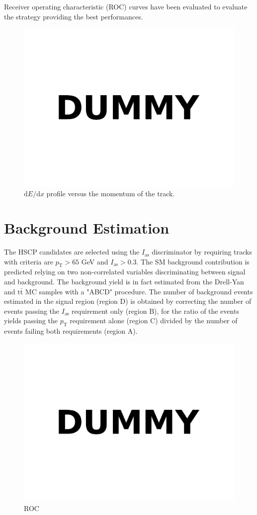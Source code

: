 \documentclass[11pt,twoside,a4paper]{article}
\begin{document}
Receiver operating characteristic (ROC) curves have been evaluated to evaluate the strategy providing the best performances.

\begin{figure}
\centering
\includegraphics[width=.5\textwidth]{figures/dummy.pdf}
\caption{$\mathrm{d}E/\mathrm{d}x$ profile versus the momentum of the track.\label{fig:dedxvsp}}
\end{figure}

\section{Background Estimation}

The HSCP candidates are selected using the $I_{\mathrm{as}}$ discriminator by requiring tracks with  criteria are $p_{\mathrm{T}} > 65$ GeV and $I_{\mathrm{as}} > 0.3$. 
The SM background contribution is predicted relying on two non-correlated variables discriminating between signal and background.
The background yield is in fact estimated from the Drell-Yan and $\mathrm{t}\bar{\mathrm{t}}$ MC samples with a "ABCD" procedure.
The number of background events estimated in the signal region (region D) is obtained by correcting the number of events passing the $I_{\mathrm{as}}$ requirement only (region B), for the ratio of the events yields passing the $p_{\mathrm{T}}$ requirement alone (region C) divided by the number of events failing both requirements (region A).

\begin{figure}
\centering
\includegraphics[width=.5\textwidth]{figures/dummy.pdf}
\caption{ROC\label{fig:roc}}
\end{figure}
\end{document}
